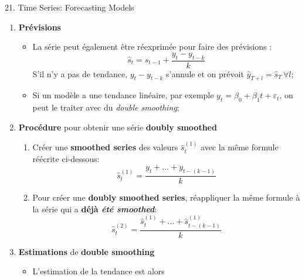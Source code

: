 \documentclass[12pt, titlepage, french]{report}
\begin{document}
\begin{CHPT_SUMM}[label = {timeseries21}]{21. Time Series: Forecasting Models}
\begin{enumerate}
\begin{itemize}
		\texttt{[image: src/smoothing-example.png]}
		\item	Un bon exemple de ceci en pratique est l'indice des prix à la consommation pour stabiliser les augmentations et mieux identifier les tendances;
		\item	La balance est donc de bien balancer le $k$ pour identifier les tendances sans faire de \textbf{oversmoothing} et être incapable d'identifier les vraies tendances;
		\end{itemize}
	\item[]	\textbf{Prévisions}
		\begin{itemize}
		\item	La série peut également être réexprimée pour faire des prévisions :
			\begin{equation*}
			\hat{s}_{t}	=	\hat{s}_{t - 1} + \frac{y_{t} - y_{t - k}}{k}
			\end{equation*}
			S'il n'y a pas de tendance, $y_{t} - y_{t - k}$ s'annule et on prévoit $\hat{y}_{T + l} = \hat{s}_{T} \, \forall l$;
		\item	Si un modèle a une tendance linéaire, par exemple $y_{t} = \beta_{0} + \beta_{1} t + \varepsilon_{t}$, on peut le traiter avec du \textit{double smoothing};
		\end{itemize}
	\item[]	\textbf{Procédure} pour obtenir une série \textbf{doubly smoothed}
		\begin{enumerate}
		\item	Créer une \textbf{smoothed series} des valeurs $\hat{s}_{t}^{(1)}$ avec la même formule réécrite ci-dessous:
			\begin{equation*}
			\hat{s}_{t}^{(1)}	
				=	\frac{y_{t} + \dots + y_{t - (k - 1)}}{k}
			\end{equation*}
		\item	Pour	 créer une \textbf{doubly smoothed series}, réappliquer la même formule à la série qui a \textbf{déjà \textit{été smoothed}}:
			\begin{equation*}
			\hat{s}_{t}^{(2)}	
				=	\frac{\hat{s}_{t}^{(1)} + \dots + \hat{s}_{t - (k - 1)}^{(1)}}{k}
			\end{equation*}
		\end{enumerate}
	\item[]	\textbf{Estimations} de \textbf{double smoothing}
		\begin{itemize}
		\item	L'estimation de la tendance est alors
			\begin{equation*}

\end{equation*}
\end{itemize}
\end{enumerate}
\end{CHPT_SUMM}
\end{document}

